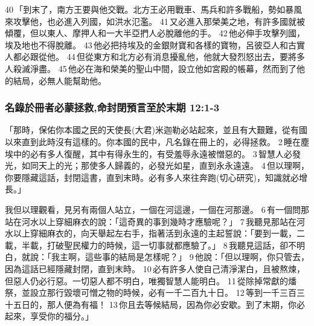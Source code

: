 40 「到末了，南方王要與他交戰。北方王必用戰車、馬兵和許多戰船，勢如暴風來攻擊他，也必進入列國，如洪水氾濫。 41 又必進入那榮美之地，有許多國就被傾覆，但以東人、摩押人和一大半亞捫人必脫離他的手。 42 他必伸手攻擊列國，埃及地也不得脫離。 43 他必把持埃及的金銀財寶和各樣的寶物，呂彼亞人和古實人都必跟從他。 44 但從東方和北方必有消息擾亂他，他就大發烈怒出去，要將多人殺滅淨盡。 45 他必在海和榮美的聖山中間，設立他如宮殿的帳幕，然而到了他的結局，必無人能幫助他。

\subsubsection{名錄於冊者必蒙拯救,命封閉預言至於末期 12:1-3}
「那時，保佑你本國之民的天使長(大君)米迦勒必站起來，並且有大艱難，從有國以來直到此時沒有這樣的。你本國的民中，凡名錄在冊上的，必得拯救。 2 睡在塵埃中的必有多人復醒，其中有得永生的，有受羞辱永遠被憎惡的。 3 智慧人必發光，如同天上的光；那使多人歸義的，必發光如星，直到永永遠遠。 4 但以理啊，你要隱藏這話，封閉這書，直到末時。必有多人來往奔跑(切心研究)，知識就必增長。」


我但以理觀看，見另有兩個人站立，一個在河這邊，一個在河那邊。 6 有一個問那站在河水以上穿細麻衣的說：「這奇異的事到幾時才應驗呢？」 7 我聽見那站在河水以上穿細麻衣的，向天舉起左右手，指著活到永遠的主起誓說：「要到一載，二載，半載，打破聖民權力的時候，這一切事就都應驗了。」 8 我聽見這話，卻不明白，就說：「我主啊，這些事的結局是怎樣呢？」 9 他說：「但以理啊，你只管去，因為這話已經隱藏封閉，直到末時。 10 必有許多人使自己清淨潔白，且被熬煉，但惡人仍必行惡。一切惡人都不明白，唯獨智慧人能明白。 11 從除掉常獻的燔祭，並設立那行毀壞可憎之物的時候，必有一千二百九十日。 12 等到一千三百三十五日的，那人便為有福！ 13 你且去等候結局，因為你必安歇。到了末期，你必起來，享受你的福分。」








































